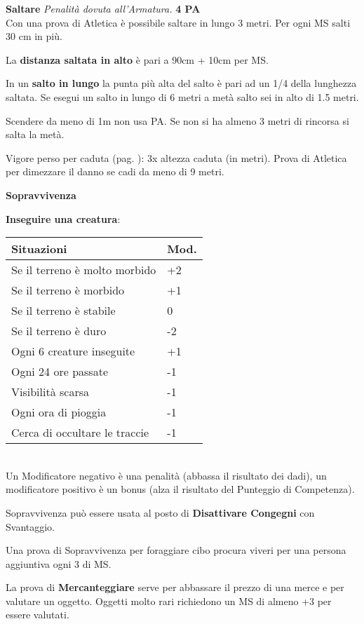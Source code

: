 \documentclass[12pt,a4paper,twoside,openany]{book}
\begin{document}
\begin{multicols}{2}
\medskip

\textbf{Saltare} \textit{Penalità dovuta all'Armatura.} \textbf{4 PA}\\

Con una prova di Atletica è possibile saltare in lungo 3 metri. Per ogni MS salti 30 cm in più.

La \textbf{distanza saltata in alto} è pari a 90cm + 10cm per MS.

In un \textbf{salto in lungo} la punta più alta del salto è pari ad un 1/4 della lunghezza saltata. Se esegui un salto in lungo di 6 metri a metà salto sei in alto di 1.5 metri.

Scendere da meno di 1m non usa PA. Se non si ha almeno 3 metri di rincorsa si salta la metà.

Vigore perso per caduta (pag. \pageref{cadute}): 3x altezza caduta (in metri). Prova di Atletica per dimezzare il danno se cadi da meno di 9 metri.

\medskip

\textbf{Sopravvivenza}

\smallskip

\textbf{Inseguire una creatura}:

\begin{tabular}{ll}
	Situazioni & Mod.\\
	\toprule
	Se il terreno è molto morbido& +2\\
	Se il terreno è morbido& +1\\
	Se il terreno è stabile& 0\\
	Se il terreno è duro& -2\\
	Ogni 6 creature inseguite& +1\\
	Ogni 24 ore passate & -1\\
	Visibilità scarsa&-1\\
	Ogni ora di pioggia&-1 \\
	Cerca di occultare le traccie& -1\\
\end{tabular}\\

Un Modificatore negativo è una penalità (abbassa il risultato dei dadi), un modificatore positivo è un bonus (alza il risultato del Punteggio di Competenza).

Sopravvivenza può essere usata al posto di \textbf{Disattivare Congegni} con Svantaggio.

Una prova di Sopravvivenza per foraggiare cibo procura viveri per una persona aggiuntiva ogni 3 di MS.

\medskip

La prova di \textbf{Mercanteggiare} serve per abbassare il prezzo di una merce e per valutare un oggetto. Oggetti molto rari richiedono un MS di almeno +3 per essere valutati.


\end{multicols}
\end{document}
